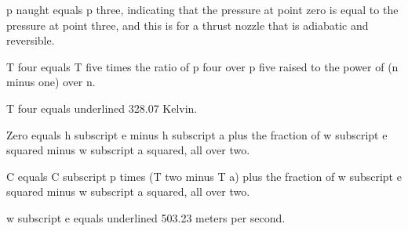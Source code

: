 p naught equals p three, indicating that the pressure at point zero is equal to the pressure at point three, and this is for a thrust nozzle that is adiabatic and reversible.

T four equals T five times the ratio of p four over p five raised to the power of (n minus one) over n.

T four equals underlined 328.07 Kelvin.

Zero equals h subscript e minus h subscript a plus the fraction of w subscript e squared minus w subscript a squared, all over two.

C equals C subscript p times (T two minus T a) plus the fraction of w subscript e squared minus w subscript a squared, all over two.

w subscript e equals underlined 503.23 meters per second.